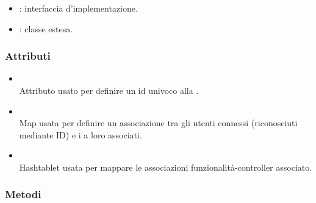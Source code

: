 \begin{itemize}
	\item {}: interfaccia d'implementazione.
	\item {}: classe estesa.
\end{itemize}

\subsubsection*{Attributi}

\begin{itemize}
	\item{}\\
	Attributo usato per definire un id univoco alla .
	\item{}\\
	Map usata per definire un associazione tra gli utenti connessi (riconosciuti mediante ID) e i  a loro associati.
	\item{}\\
	Hashtablet usata per mappare le associazioni funzionalità-controller associato.
\end{itemize}

\subsubsection*{Metodi}

